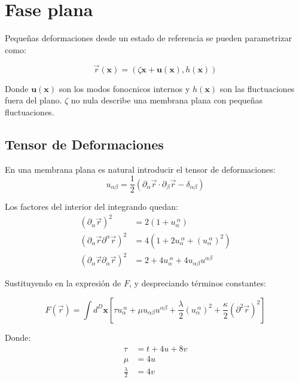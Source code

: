 \section{Fase plana}

Pequeñas deformaciones desde un estado de referencia se pueden parametrizar
como:

\begin{equation}
\vec{r}(\mathbf{x})=(\zeta \mathbf{x}+\mathbf{u(\mathbf{x})},h(\mathbf{x}))
\end{equation}

Donde $\mathbf{u(\mathbf{x})}$ son los modos fonocnicos internos y
$h(\mathbf{x})$ son las fluctuaciones fuera del plano.
$\zeta$ no nula describe una membrana plana con pequeñas fluctuaciones.

\subsection{Tensor de Deformaciones}

En una membrana plana es natural introducir el tensor de deformaciones:
\begin{equation}
u_{\alpha\beta}=\frac{1}{2}(\partial_{\alpha}\vec{r}\cdot\partial_{\beta}\vec{r}-\delta_{\alpha\beta})
\end{equation}

Los factores del interior del integrando quedan:
\begin{align}
(\partial_{\alpha}\vec{r})^2&=2(1+u_{\alpha}^{\ \alpha})\\
(\partial_{\alpha}\vec{r}\partial^{\alpha}\vec{r})^2&=4(1+2u_{\alpha}^{\
  \alpha}+(u_{\alpha}^{\ \alpha})^2)\\
(\partial_{\alpha}\vec{r}\partial_{\alpha}\vec{r})^2&=2+4u_{\alpha}^{\
  \alpha}+4u_{\alpha\beta}u^{\alpha\beta}
\end{align}

Sustituyendo en la expresión de $F$, y despreciando términos constantes:

\begin{equation}
F(\vec{r})=\int d^D\mathbf{x}
\left[\tau u_{\alpha}^{\ \alpha}+
\mu u_{\alpha\beta}u^{\alpha\beta} +
\frac{\lambda}{2}(u_{\alpha}^{\ \alpha})^2 +
\frac{\kappa}{2}(\partial^2\vec{r})^2\right]
\end{equation}

Donde:
\begin{align}
\tau&=t+4u+8v\\
\mu&=4u\\
\frac{\lambda}{2}&=4v
\end{align}

